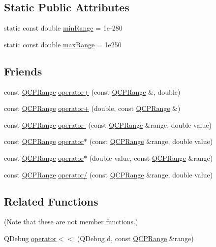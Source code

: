 \subsection*{Static Public Attributes}
\begin{DoxyCompactItemize}
\item 
static const double \hyperlink{class_q_c_p_range_ab46d3bc95030ee25efda41b89e2b616b}{min\+Range} = 1e-\/280
\item 
static const double \hyperlink{class_q_c_p_range_a5ca51e7a2dc5dc0d49527ab171fe1f4f}{max\+Range} = 1e250
\end{DoxyCompactItemize}
\subsection*{Friends}
\begin{DoxyCompactItemize}
\item 
const \hyperlink{class_q_c_p_range}{Q\+C\+P\+Range} \hyperlink{class_q_c_p_range_af53ea6fb823a4a5897162b865841de04}{operator+} (const \hyperlink{class_q_c_p_range}{Q\+C\+P\+Range} \&, double)
\item 
const \hyperlink{class_q_c_p_range}{Q\+C\+P\+Range} \hyperlink{class_q_c_p_range_a9fb2e9941d32001482df670c0d704977}{operator+} (double, const \hyperlink{class_q_c_p_range}{Q\+C\+P\+Range} \&)
\item 
const \hyperlink{class_q_c_p_range}{Q\+C\+P\+Range} \hyperlink{class_q_c_p_range_a797f82830b516646da8873f82e39e356}{operator-\/} (const \hyperlink{class_q_c_p_range}{Q\+C\+P\+Range} \&range, double value)
\item 
const \hyperlink{class_q_c_p_range}{Q\+C\+P\+Range} \hyperlink{class_q_c_p_range_a558b1248ff6a9e41fd5b2630555a8acc}{operator$\ast$} (const \hyperlink{class_q_c_p_range}{Q\+C\+P\+Range} \&range, double value)
\item 
const \hyperlink{class_q_c_p_range}{Q\+C\+P\+Range} \hyperlink{class_q_c_p_range_a5cb2332f6957021f47cc768089f4f090}{operator$\ast$} (double value, const \hyperlink{class_q_c_p_range}{Q\+C\+P\+Range} \&range)
\item 
const \hyperlink{class_q_c_p_range}{Q\+C\+P\+Range} \hyperlink{class_q_c_p_range_a4b366a3a21974c88e09b0d39d4a24a4b}{operator/} (const \hyperlink{class_q_c_p_range}{Q\+C\+P\+Range} \&range, double value)
\end{DoxyCompactItemize}
\subsection*{Related Functions}
(Note that these are not member functions.) \begin{DoxyCompactItemize}
\item 
Q\+Debug \hyperlink{class_q_c_p_range_ab4b7d434541ec2e2e00ef3764dde90d8}{operator$<$$<$} (Q\+Debug d, const \hyperlink{class_q_c_p_range}{Q\+C\+P\+Range} \&range)
\end{DoxyCompactItemize}


